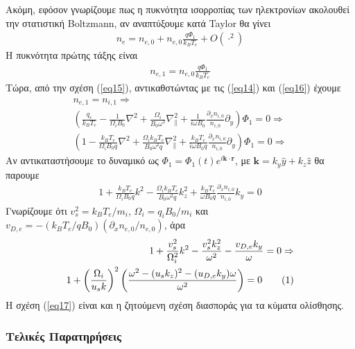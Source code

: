 \documentclass[a4paper]{article}
\newcommand\numberthis{\addtocounter{equation}{1}\tag{\theequation}}
\begin{document}
	Ακόμη, εφόσον γνωρίζουμε πως η πυκνότητα ισορροπίας των ηλεκτρονίων ακολουθεί την στατιστική Boltzmann, αν αναπτύξουμε κατά Taylor θα γίνει 
		\begin{align*}
			n_e = n_{e,0} + n_{e,0} \frac{q\Phi_1}{k_BT_e} + O(\cdot^2)
		\end{align*}
	Η πυκνότητα πρώτης τάξης είναι 
		\begin{align}\label{eq16}
			n_{e,1} = n_{e,0} \frac{q\Phi_1}{k_BT_e}
		\end{align}
	Τώρα, από την σχέση (\ref{eq15}), αντικαθστώντας με τις (\ref{eq14}) και (\ref{eq16}) έχουμε
		\begin{align*}
			n_{e,1} = n_{i,1} \Rightarrow\\ 
            \left( \frac{q_e}{k_B T_e} - \frac{1}{\Omega_i B_0}\nabla^2 + \frac{\Omega_i}{B_0\omega^2	}\nabla_{\parallel}^2 + \frac{1}{i\omega B_0}\frac{\partial_xn_{i,0}}{n_{i,0}}\partial_y    \right)\Phi_1   = 0 \Rightarrow\\
           \left( 1 - \frac{k_BT_e}{\Omega_i B_0q}\nabla^2 +  
           		 \frac{\Omega_ik_BT_e}{B_0\omega^2q}\nabla_{\parallel}^2 + \frac{k_BT_e}{i\omega B_0 q}\frac{\partial_xn_{i,0}}{n_{i,0}}\partial_y    \right)\Phi_1  	 =0 	\Rightarrow 
		\end{align*}
	Αν αντικαταστήσουμε το δυναμικό ως $\Phi_1 = \Phi_1(t) e^{i\bm{k}\cdot\bm{r}}$, με $\bm{k} = k_y \hat{y} + k_z\hat{z}$ θα παρουμε 
	\begin{align*}
		1 + \frac{k_BT_e}{\Omega_i B_0q}k^2 -  
           		 \frac{\Omega_ik_BT_e}{B_0\omega^2q}k_z^2 + \frac{k_BT_e}{\omega B_0 q}\frac{\partial_xn_{i,0}}{n_{i,0}}k_y =0  
	\end{align*}
	Γνωρίζουμε ότι $v_s^2 = k_BT_e/m_i$, $\Omega_i = q_iB_0/m_i$ και $v_{D,e} = -(k_BT_e/qB_0)(\partial_xn_{e,0}/ n_{e,0})$, άρα 
	\begin{align*}\label{eq17}
		1 + \frac{v_s^2}{\Omega_i^2}k^2 - \frac{v_s^2k_z^2}{\omega^2} - \frac{v_{D,e}k_y}{\omega} = 0 \Rightarrow \\ 
  		1 + \left( \frac{\Omega_i}{u_sk}\right)^2\left(\frac{\omega^2 - (u_sk_z)^2 - (u_{D,e}k_y)\omega}{\omega^2}	\right) =0\numberthis
  			\end{align*}
  		Η σχέση  (\ref{eq17}) είναι και η ζητούμενη σχέση διασποράς για τα κύματα ολίσθησης.
  		
  		\subsubsection*{Τελικές Παρατηρήσεις}
\end{document}
